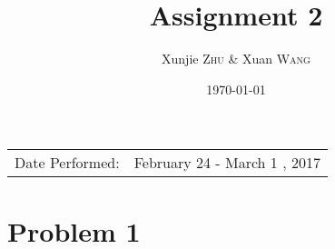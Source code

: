 \documentclass{article}
\title{Assignment 2} %
\author{Xunjie \textsc{Zhu}  \& Xuan \textsc{Wang}} %
\date{\today} %
\begin{document}
\maketitle %

\begin{center}
\begin{tabular}{l r}
Date Performed: & February 24 - March 1 , 2017 \\ %
\end{tabular}
\end{center}






\section{Problem 1}
\end{document}

